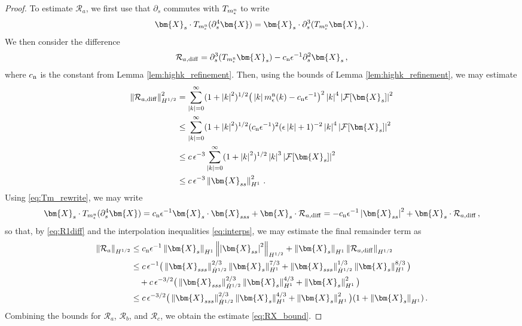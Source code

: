 \documentclass[11pt,reqno]{amsart}
\newcommand{\X}{\bm{X}}
\newcommand{\p}{\partial}
\newcommand{\abs}[1]{\left\lvert #1 \right\rvert}
\newcommand{\norm}[1]{\left\lVert #1 \right\rVert}
\newcommand{\mc}[1]{\mathcal{#1}}
\numberwithin{equation}{section}
\theoremstyle{definition}
\begin{document}
\begin{proof}
To estimate $\mc{R}_a$, we first use that $\p_s$ commutes with $T_{m_\epsilon^{\rm n}}$ to write 
\begin{equation}\label{eq:Tm_rewrite}
  \X_s\cdot T_{m_\epsilon^{\rm n}}(\p_s^4\X) = \X_s\cdot \p_s^3(T_{m_\epsilon^{\rm n}}\X_s)\,.
\end{equation}
%
We then consider the difference
\begin{equation}
  \mc{R}_{a,\rm diff}= \p_s^3(T_{m_\epsilon^{\rm n}}\X_s) - c_{\rm n}\epsilon^{-1}\p_s^2\X_s \,,
\end{equation}
where $c_{\rm n}$ is the constant from Lemma \ref{lem:highk_refinement}. Then, using the bounds of Lemma \ref{lem:highk_refinement}, we may estimate 
\begin{equation}\label{eq:R1diff}
\begin{aligned}
\norm{\mc{R}_{a,\rm diff}}_{H^{1/2}}^2 &=
  \sum_{\abs{k}=0}^\infty(1+\abs{k}^2)^{1/2}\big(\abs{k}m_\epsilon^{\rm n}(k) -c_{\rm n}\epsilon^{-1} \big)^2\abs{k}^4\abs{\mc{F}[\X_s]}^2\\
  &\le  \sum_{\abs{k}=0}^\infty(1+\abs{k}^2)^{1/2}(c_{\rm n}\epsilon^{-1})^2 (\epsilon\abs{k}+1)^{-2}\abs{k}^4\abs{\mc{F}[\X_s]}^2\\
  &\le  c\,\epsilon^{-3}\sum_{\abs{k}=0}^\infty(1+\abs{k}^2)^{1/2}\abs{k}^3\abs{\mc{F}[\X_s]}^2\\
  &\le  c\,\epsilon^{-3}\norm{\X_{ss}}_{H^1}^2\,.
\end{aligned}
\end{equation}
%
Using \eqref{eq:Tm_rewrite}, we may write
\begin{equation}
  \X_s\cdot T_{m_\epsilon^{\rm n}}(\p_s^4\X) = c_{\rm n}\epsilon^{-1}\X_s\cdot \X_{sss} + \X_s\cdot\mc{R}_{a,\rm diff}
  = - c_{\rm n}\epsilon^{-1}\abs{\X_{ss}}^2+ \X_s\cdot\mc{R}_{a,\rm diff}\,,
\end{equation}
so that, by \eqref{eq:R1diff} and the interpolation inequalities \eqref{eq:interps}, we may estimate the final remainder term as 
\begin{equation}
\begin{aligned}
  \norm{\mc{R}_a}_{H^{1/2}} &\le c_{\rm n}\epsilon^{-1}\norm{\X_s}_{H^1}\norm{\abs{\X_{ss}}^2}_{H^{1/2}} + \norm{\X_s}_{H^1}\norm{\mc{R}_{a,\rm diff}}_{H^{1/2}} \\
  &\le c\,\epsilon^{-1}\big(\norm{\X_{sss}}_{\dot H^{1/2}}^{2/3}\norm{\X_s}_{H^1}^{7/3}+ \norm{\X_{sss}}_{\dot H^{1/2}}^{1/3}\norm{\X_s}_{H^1}^{8/3}\big) \\
  &\quad + c\,\epsilon^{-3/2}\big(\norm{\X_{sss}}_{\dot H^{1/2}}^{2/3}\norm{\X_s}_{H^1}^{4/3} + \norm{\X_s}_{H^1}^2 \big)\\
  &\le c\,\epsilon^{-3/2}\big(\norm{\X_{sss}}_{\dot H^{1/2}}^{2/3}\norm{\X_s}_{H^1}^{4/3} + \norm{\X_s}_{H^1}^2 \big)(1+\norm{\X_s}_{H^1})\,.
\end{aligned}
\end{equation}
%
Combining the bounds for $\mc{R}_a$, $\mc{R}_b$, and $\mc{R}_c$, we obtain the estimate \eqref{eq:RX_bound}. 



\end{proof}
\end{document}
